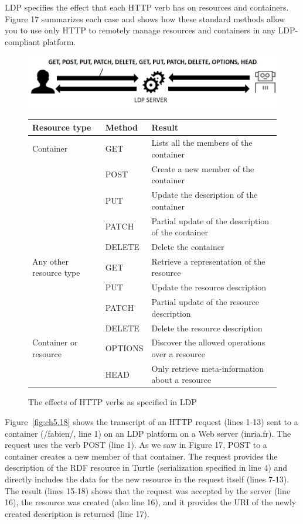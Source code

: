 LDP specifies the effect that each HTTP verb has on resources and
containers. Figure 17 summarizes each case and shows how these standard
methods allow you to use only HTTP to remotely manage resources and
containers in any LDP-compliant platform.


\begin{figure}
\includegraphics[width=5.0in]{media/ch5/figure-05-17.jpg}
\begin{tabular}{|lll|}
\hline
\textbf{Resource type} & \textbf{Method} & \textbf{Result}\tabularnewline
\hline\hline
Container & GET & Lists all the members of the container\tabularnewline
& POST & Create a new member of the container\tabularnewline
& PUT & Update the description of the container\tabularnewline
& PATCH & Partial update of the description of the
container\tabularnewline
& DELETE & Delete the container\tabularnewline
\hline
Any other resource type & GET & Retrieve a representation of the
resource\tabularnewline
& PUT & Update the resource description\tabularnewline
& PATCH & Partial update of the resource description\tabularnewline
& DELETE & Delete the resource description\tabularnewline
\hline\hline
Container or resource & OPTIONS & Discover the allowed operations over a
resource\tabularnewline
& HEAD & Only retrieve meta-information about a resource\tabularnewline
\hline
\end{tabular}
 \label{fig:ch5.17}
 \caption{The effects of HTTP verbs as specified in LDP}
\end{figure}


Figure~\ref{fig:ch5.18} shows the transcript of an HTTP request (lines 1-13) sent to a
container (/fabien/, line 1) on an LDP platform on a Web server
(inria.fr). The request uses the verb POST (line 1). As we saw in Figure
17, POST to a container creates a new member of that container. The
request provides the description of the RDF resource in Turtle
(serialization specified in line 4) and directly includes the data for
the new resource in the request itself (lines 7-13). The result (lines
15-18) shows that the request was accepted by the server (line 16), the
resource was created (also line 16), and it provides the URI of the
newly created description is returned (line 17).

